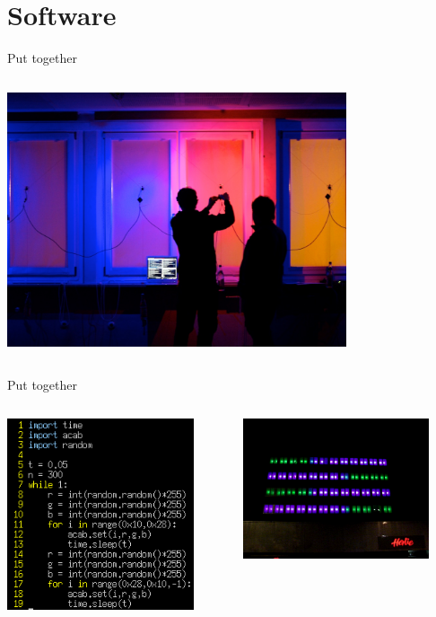 \documentclass{beamer}
\begin{document}
\section{Software}
\begin{frame}{Put together}
  \begin{columns}
    \begin{column}{10cm}
      \includegraphics[width=10cm]{bilder/tests.jpg}
    \end{column}
  \end{columns}
\end{frame}
\begin{frame}{Put together}
  \begin{columns}
    \begin{column}{5cm}
      \includegraphics[width=5.5cm, clip, trim= 0 0 0 0]{bilder/fill.png}
    \end{column}
    \begin{column}{5cm}
      \includegraphics[width=5.5cm]{bilder/fail.png}
    \end{column}
  \end{columns}
\end{frame}
\end{document}
